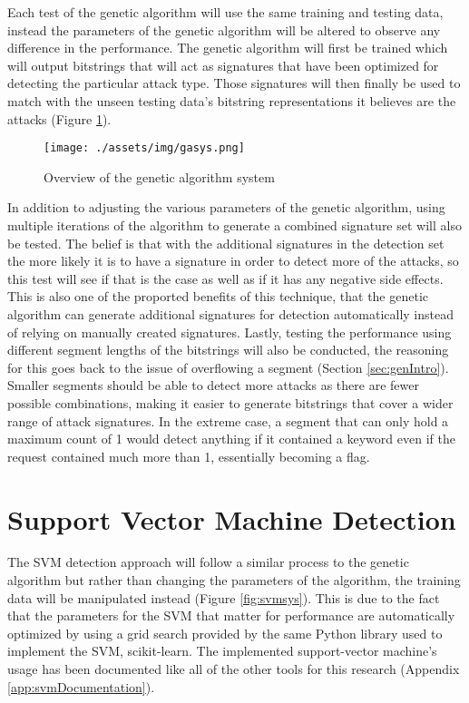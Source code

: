 Each test of the genetic algorithm will use the same training and testing data, instead the parameters of the genetic algorithm will be altered to observe any difference in the performance.  The genetic algorithm will first be trained which will output bitstrings that will act as signatures that have been optimized for detecting the particular attack type. Those signatures will then finally be used to match with the unseen testing data's bitstring representations it believes are the attacks (Figure \ref{fig:gasys}).

\begin{figure}
	\texttt{[image: ./assets/img/gasys.png]}
	\caption{Overview of the genetic algorithm system}
	\label{fig:gasys}
\end{figure}

In addition to adjusting the various parameters of the genetic algorithm, using multiple iterations of the algorithm to generate a combined signature set will also be tested.  The belief is that with the additional signatures in the detection set the more likely it is to have a signature in order to detect more of the attacks, so this test will see if that is the case as well as if it has any negative side effects.  This is also one of the proported benefits of this technique, that the genetic algorithm can generate additional signatures for detection automatically instead of relying on manually created signatures.  Lastly, testing the performance using different segment lengths of the bitstrings will also be conducted, the reasoning for this goes back to the issue of overflowing a segment (Section \ref{sec:genIntro}).  Smaller segments should be able to detect more attacks as there are fewer possible combinations, making it easier to generate bitstrings that cover a wider range of attack signatures.  In the extreme case, a segment that can only hold a maximum count of 1 would detect anything if it contained a keyword even if the request contained much more than 1, essentially becoming a flag.

\section{Support Vector Machine Detection}

The SVM detection approach will follow a similar process to the genetic algorithm but rather than changing the parameters of the algorithm, the training data will be manipulated instead (Figure \ref{fig:svmsys}).  This is due to the fact that the parameters for the SVM that matter for performance are automatically optimized by using a grid search provided by the same Python library used to implement the SVM, scikit-learn.\cite{scikit-learn}  The implemented support-vector machine's usage has been documented like all of the other tools for this research (Appendix \ref{app:svmDocumentation}).

